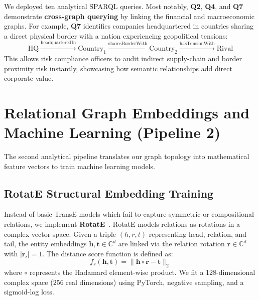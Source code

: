 \documentclass[10pt,journal,compsoc]{IEEEtran}
\begin{document}
We deployed ten analytical SPARQL queries. Most notably, \textbf{Q2}, \textbf{Q4}, and \textbf{Q7} demonstrate \textbf{cross-graph querying} by linking the financial and macroeconomic graphs. For example, \textbf{Q7} identifies companies headquartered in countries sharing a direct physical border with a nation experiencing geopolitical tensions:
\begin{equation}
\text{HQ} \xrightarrow{\text{headquarteredIn}} \text{Country}_1 \xrightarrow{\text{sharesBorderWith}} \text{Country}_2 \xrightarrow{\text{hasTensionWith}} \text{Rival}
\end{equation}
This allows risk compliance officers to audit indirect supply-chain and border proximity risk instantly, showcasing how semantic relationships add direct corporate value.

\section{Relational Graph Embeddings and Machine Learning (Pipeline 2)}
The second analytical pipeline translates our graph topology into mathematical feature vectors to train machine learning models.

\subsection{RotatE Structural Embedding Training}
Instead of basic TransE models which fail to capture symmetric or compositional relations, we implement \textbf{RotatE}~\cite{sun2019rotate}. RotatE models relations as rotations in a complex vector space. Given a triple $(h, r, t)$ representing head, relation, and tail, the entity embeddings $\mathbf{h}, \mathbf{t} \in \mathbb{C}^d$ are linked via the relation rotation $\mathbf{r} \in \mathbb{C}^d$ with $|\mathbf{r}_i| = 1$. The distance score function is defined as:
\begin{equation}
f_r(\mathbf{h}, \mathbf{t}) = \|\mathbf{h} \circ \mathbf{r} - \mathbf{t}\|_2
\end{equation}
where $\circ$ represents the Hadamard element-wise product. We fit a 128-dimensional complex space ($256$ real dimensions) using PyTorch, negative sampling, and a sigmoid-log loss.
\end{document}
